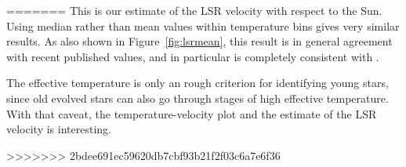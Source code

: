 \documentclass{aastex62}
\begin{document}
=======
This is our estimate of the LSR velocity with respect to the Sun.  Using median rather than mean values within temperature bins gives very similar results. As also shown in Figure~\ref{fig:lsrmean}, this result is in general agreement with recent published values, and in particular is completely consistent with \cite{schoenrich}.

The effective temperature is only an rough criterion for identifying
young stars, since old evolved stars can also go through stages of
high effective temperature.  With that caveat, the temperature-velocity
plot and the estimate of the LSR velocity is interesting.




>>>>>>> 2bdee691ec59620db7cbf93b21f2f03c6a7e6f36
\end{document}
